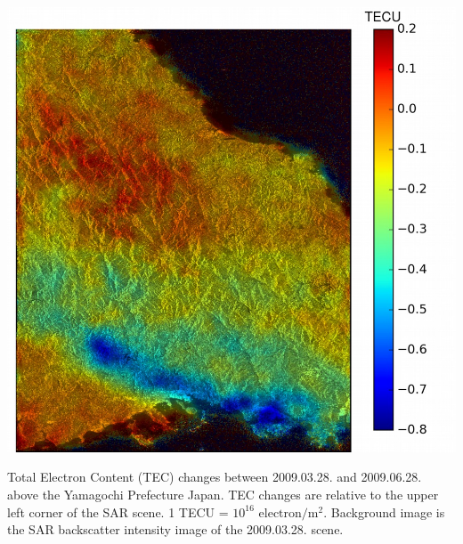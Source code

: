 \documentclass{beamer}
\begin{document}
\begin{frame}{\ft}
    \begin{minipage}[c]{0.7\textwidth}
        \includegraphics[width=1.0\textwidth]{iono.png}
    \end{minipage}
    \begin{minipage}[c]{0.28\textwidth}
         Total Electron Content (TEC) changes between 2009.03.28. and 2009.06.28. above the Yamagochi Prefecture Japan. TEC changes are relative to the upper left corner of the SAR scene. 1 TECU = $10^{16}$ $\mathrm{electron} / \mathrm{m}^2$. Background image is the SAR backscatter intensity image of the 2009.03.28. scene.
    \end{minipage}
\end{frame}
\end{document}
